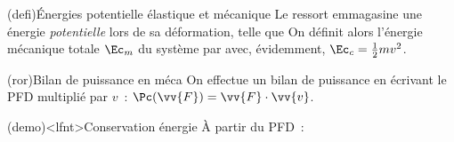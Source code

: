 \documentclass[../../main/main.tex]{subfiles}
\begin{document}
\begin{tcb}[label=def:emeca, sidebyside](defi){Énergies potentielle élastique et mécanique}
	Le ressort emmagasine une énergie \textit{potentielle} lors de sa
	déformation, telle que
	\psw{
		\[
			\boxed{
				\Ec_{p\rm, el} = \frac{1}{2}k(\ell-\ell_0)^2 = \frac{1}{2}kx^2
			}
		\]
	}
	\tcblower
	On définit alors l'énergie mécanique totale $\Ec_m$ du système par
	\psw{
		\[
			\boxed{\Ec_m = \Ec_c + \Ec_{p\rm, el}}
		\]
	}
	avec, évidemment, $\Ec_c = \frac{1}{2}mv^2$.
\end{tcb}
\begin{tcb}[fontupper=\Large, bld, cnt](ror){Bilan de puissance en méca}
	On effectue un bilan de puissance en écrivant le PFD multiplié par $v$~:
	$\Pc(\vv{F}) = \vv{F}\cdot \vv{v}$.
\end{tcb}
\begin{tcb}[label=demo:emecacons](demo)<lfnt>{Conservation énergie}
	À partir du PFD~:
	\vspace{-15pt}
	\vspace{-15pt}
\end{tcb}
\end{document}
